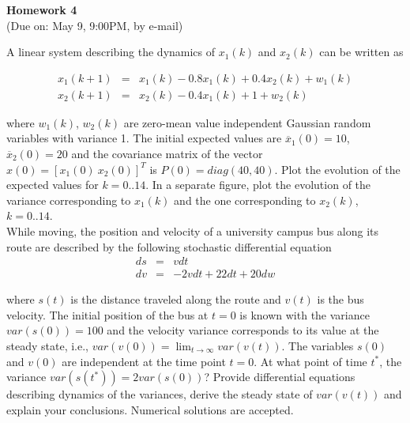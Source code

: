 \documentclass{article}
\begin{document}
 
\begin{center}
{\bf \Large  Homework 4} \\
(Due on: May 9, 9:00PM, by e-mail)
\end{center}

 A linear system describing the dynamics of 
$x_1(k)$ and $x_2(k)$ can be written as

\begin{eqnarray}
  x_1(k+1) &=& x_1(k)-0.8x_1(k)+0.4x_2(k)+w_1(k) \\
  x_2(k+1) &=& x_2(k)-0.4x_1(k)+1+w_2(k) 
\end{eqnarray}

\noindent where $w_1(k)$, $w_2(k)$ are zero-mean value independent Gaussian random 
variables with variance 1. The initial expected values are $\overline{x}_1(0) = 10$, 
$\overline{x}_2(0) = 20$ and the covariance matrix of the vector $x(0) = [x_1(0)\ x_2(0)]^T$
is $P(0) = diag(40, 40)$. Plot the evolution of the expected values for $k=0..14$. In a separate figure, plot the evolution of the variance corresponding to $x_1(k)$ and the one corresponding to $x_2(k)$, $k=0..14$.  \\ 


 While moving, the position and velocity of a university campus bus along its route are described by the following stochastic differential equation
\begin{eqnarray}
  ds &=& vdt \\
  dv &=& -2vdt+22dt+20dw 
\end{eqnarray}

\noindent where $s(t)$ is the distance traveled along the route and $v(t)$ is the bus velocity. The initial position of the bus at $t = 0$ is known with the variance $var(s(0)) =100$ and the velocity variance corresponds to its value at the steady state, i.e.,
$var(v(0)) = \lim_{t \rightarrow \infty} var(v(t))$. The variables $s(0)$ and $v(0)$ are 
independent at the time point $t = 0$. At what point of time $t^*$, the variance $var(s(t^*)) = 2var(s(0))$? Provide differential equations describing dynamics of the variances, derive the steady state of $var(v(t))$ and explain your conclusions. Numerical solutions are accepted.
\end{document}
